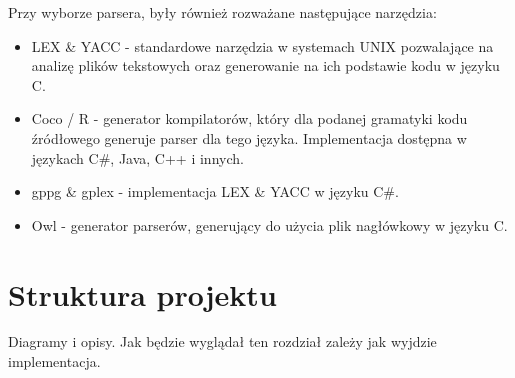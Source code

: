 \par Przy wyborze parsera, były również rozważane następujące narzędzia:
\begin{itemize}
  \item LEX \& YACC - standardowe narzędzia w systemach UNIX pozwalające na analizę plików tekstowych oraz generowanie na ich podstawie kodu w języku C.
  \item Coco / R - generator kompilatorów, który dla podanej gramatyki kodu źródłowego generuje parser dla tego języka. Implementacja dostępna w językach C\#, Java, C++ i innych.
  \item gppg \& gplex - implementacja LEX \& YACC w języku C\#.
  \item Owl - generator parserów, generujący do użycia plik nagłówkowy w języku C.
\end{itemize}



\section{Struktura projektu}
Diagramy i opisy.
Jak będzie wyglądał ten rozdział zależy jak wyjdzie implementacja.
